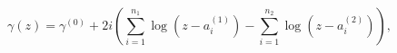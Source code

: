 \begin{equation} 
\gamma (z)=\gamma^{(0)}+2i\left (\sum_{i=1}^{n_1}\log (z-a_i^{(1)})
- \sum_{i=1}^{n_2}\log (z-a_i^{(2)})\right ),
\label{5} 
\end{equation} 
